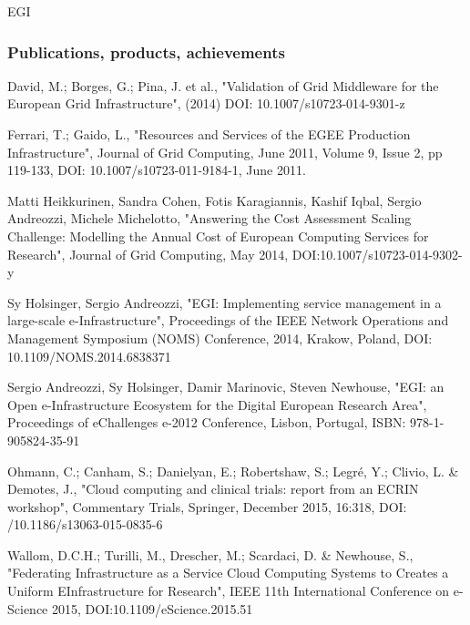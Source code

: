 \begin{sitedescription}{EGI}
%



\subsubsection*{Publications, products, achievements}

\begin{compactenum}
\item David, M.; Borges, G.; Pina, J. et al., "Validation of Grid Middleware for the European Grid Infrastructure", (2014) DOI: 10.1007/s10723-014-9301-z 
\item Ferrari, T.; Gaido, L., "Resources and Services of the EGEE Production Infrastructure", Journal of Grid Computing, June 2011, Volume 9, Issue 2, pp 119-133, DOI: 10.1007/s10723-011-9184-1, June 2011. 
\item Matti Heikkurinen, Sandra Cohen, Fotis Karagiannis, Kashif Iqbal, Sergio Andreozzi, Michele Michelotto, "Answering the Cost Assessment Scaling Challenge: Modelling the Annual Cost of European Computing Services for Research", Journal of Grid Computing, May 2014, DOI:10.1007/s10723-014-9302-y 
\item Sy Holsinger, Sergio Andreozzi, "EGI: Implementing service management in a large-scale e-Infrastructure", Proceedings of the IEEE Network Operations and Management Symposium (NOMS) Conference, 2014, Krakow, Poland, DOI: 10.1109/NOMS.2014.6838371
\item Sergio Andreozzi, Sy Holsinger, Damir Marinovic, Steven Newhouse, "EGI: an Open e-Infrastructure Ecosystem for the Digital European Research Area", Proceedings of eChallenges e-2012 Conference, Lisbon, Portugal, ISBN: 978-1-905824-35-91 
\item Ohmann, C.; Canham, S.; Danielyan, E.; Robertshaw, S.; Legr\'e, Y.; Clivio, L. \& Demotes, J., "Cloud computing and clinical trials: report from an ECRIN workshop", Commentary Trials, Springer, December 2015, 16:318, DOI: /10.1186/s13063-015-0835-6 \newline
\item Wallom, D.C.H.; Turilli, M., Drescher, M.; Scardaci, D. \& Newhouse, S., "Federating Infrastructure as a Service Cloud Computing Systems to Creates a Uniform EInfrastructure for Research", IEEE 11th International Conference on e-Science 2015, DOI:10.1109/eScience.2015.51

\end{compactenum}
\end{sitedescription}

